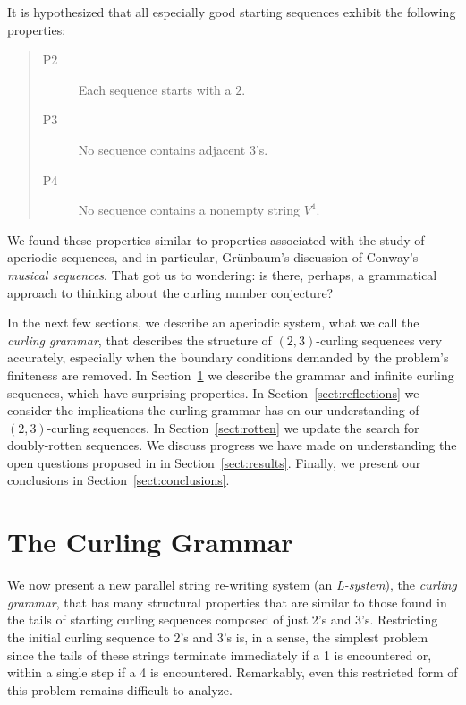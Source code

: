 \documentclass[11pt]{article}
\def\emph#1{{\em #1\/}}
\def\term#1{\emph{#1}}
\def\ni{\noindent}
\def\twth{$(2,3)$}
\begin{document}
It is hypothesized that all especially good starting sequences exhibit
the following properties:
\begin{quote}
\begin{description}
\item[P2] Each sequence starts with a $2$.
\item[P3] No sequence contains adjacent $3$'s.
\item[P4] No sequence contains a nonempty string $V^4$.
\end{description}
\end{quote}
\ni We found these properties similar to properties associated with the study
of aperiodic sequences, and in particular, Gr\"unbaum's discussion of Conway's
\term{musical sequences}.  That got us to wondering: is there, perhaps, a
grammatical approach to thinking about the curling number conjecture?

In the next few sections, we describe an aperiodic system, what we call the
\term{curling grammar}, that describes the structure of \twth-curling sequences very
accurately, especially when the boundary conditions demanded by the problem's
finiteness are removed.  In Section~\ref{sect:ABg} we describe the grammar
and infinite curling sequences, which have surprising properties.  In
Section~\ref{sect:reflections} we consider the implications the curling
grammar has on our understanding of \twth-curling sequences.
In Section~\ref{sect:rotten} we update the search for doubly-rotten sequences.
We discuss progress we have made on understanding the open questions proposed
in \cite{Ch13} in Section~\ref{sect:results}.  Finally, we present our
conclusions in Section~\ref{sect:conclusions}.

\section{The Curling Grammar}\label{sect:ABg}
We now present a new parallel string re-writing system (an \term{L-system}), the \term{curling grammar}, that has many structural properties
that are similar to those found in the tails of starting curling sequences
composed of just 2's and 3's. Restricting the initial curling sequence to 
2's and 3's is, in a sense, the simplest problem since the tails of these
strings terminate immediately if a 1 is encountered or, within a single step
if a 4 is encountered.  Remarkably, even this restricted form of this problem
remains difficult to analyze.
\end{document}
